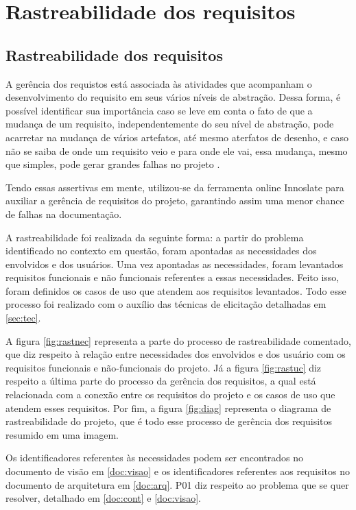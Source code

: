 \part{Rastreabilidade dos requisitos}
\chapter[Rastreabilidade dos requisitos]{Rastreabilidade dos requisitos}

A gerência dos requistos está associada às atividades que acompanham o desenvolvimento do requisito em seus vários níveis de abstração. Dessa forma, é possível identificar sua importância caso se leve em conta o fato de que a mudança de um requisito, independentemente do seu nível de abstração, pode acarretar na mudança de vários artefatos, até mesmo aterfatos de desenho, e caso não se saiba de onde um requisito veio e para onde ele vai, essa mudança, mesmo que simples, pode gerar grandes falhas no projeto \cite{sayao2006rastreabilidade}.

Tendo essas assertivas em mente, utilizou-se da ferramenta online Innoslate para auxiliar a gerência de requisitos do projeto, garantindo assim uma menor chance de falhas na documentação.

A rastreabilidade foi realizada da seguinte forma: a partir do problema identificado no contexto em questão, foram apontadas as necessidades dos envolvidos e dos usuários. Uma vez apontadas as necessidades, foram levantados requisitos funcionais e não funcionais referentes a essas necessidades. Feito isso, foram definidos os casos de uso que atendem aos requisitos levantados. Todo esse processo foi realizado com o auxílio das técnicas de elicitação detalhadas em \ref{sec:tec}.

A figura \ref{fig:rastnec} representa a parte do processo de rastreabilidade comentado, que diz respeito à relação entre necessidades dos envolvidos e dos usuário com os requisitos funcionais e não-funcionais do projeto. Já a figura \ref{fig:rastuc} diz respeito a última parte do processo da gerência dos requisitos, a qual está relacionada com a conexão entre os requisitos do projeto e os casos de uso que atendem esses requisitos. Por fim, a figura \ref{fig:diag} representa o diagrama de rastreabilidade do projeto, que é todo esse processo de gerência dos requisitos resumido em uma imagem.

Os identificadores referentes às necessidades podem ser encontrados no documento de visão em \ref{doc:visao} e os identificadores referentes aos requisitos no documento de arquitetura em \ref{doc:arq}. P01 diz respeito ao problema que se quer resolver, detalhado em \ref{doc:cont} e \ref{doc:visao}.

